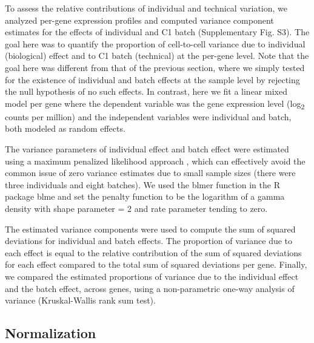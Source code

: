 To assess the relative contributions of individual and technical
variation, we analyzed per-gene expression profiles and computed
variance component estimates for the effects of individual and C1 batch
(Supplementary Fig. S3). The goal here was to quantify the proportion of
cell-to-cell variance due to individual (biological) effect and to C1
batch (technical) at the per-gene level. Note that the goal here was
different from that of the previous section, where we simply tested for
the existence of individual and batch effects at the sample level by
rejecting the null hypothesis of no such effects. In contrast, here we
fit a linear mixed model per gene where the dependent variable was the
gene expression level (log\textsubscript{2} counts per million) and the
independent variables were individual and batch, both modeled as random
effects.

The variance parameters of individual effect and batch effect were
estimated using a maximum penalized likelihood approach
\citep{Chung2013}, which can effectively avoid the common issue of zero
variance estimates due to small sample sizes (there were three
individuals and eight batches). We used the blmer function in the R
package blme and set the penalty function to be the logarithm of a gamma
density with shape parameter = 2 and rate parameter tending to zero.

The estimated variance components were used to compute the sum of
squared deviations for individual and batch effects. The proportion of
variance due to each effect is equal to the relative contribution of the
sum of squared deviations for each effect compared to the total sum of
squared deviations per gene. Finally, we compared the estimated
proportions of variance due to the individual effect and the batch
effect, across genes, using a non-parametric one-way analysis of
variance (Kruskal-Wallis rank sum test).

\subsection{Normalization}\label{normalization}

